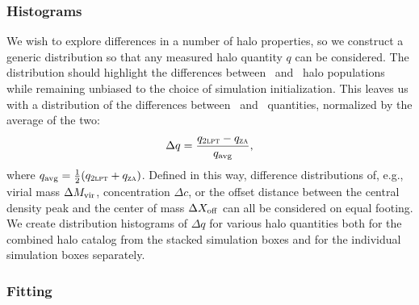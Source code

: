 \subsubsection{Histograms}
\label{subsubsec:analysis--difference_histograms--binning}


We wish to explore differences in a number of halo properties, so we construct a generic distribution so that any measured halo quantity $q$ can be considered.  The distribution should  highlight the differences between \lpt\ and \za\ halo populations while remaining unbiased to the choice of simulation initialization.  This leaves us with a distribution of the differences between \lpt\ and \za\ quantities, normalized by the average of the two:
\begin{equation} \label{eq:analysis--delta_q}
	\Delta q = \frac{q_{\textsc{2lpt}} - q_{\textsc{za}}}{q_{\mathrm{avg}}},
\end{equation}
where $q_{\mathrm{avg}} = \frac{1}{2} (q_{\textsc{2lpt}} + q_{\textsc{za}})$.  Defined in this way, difference distributions of, e.g.,  virial mass $\Delta {M_{\mathrm{vir}}}$, concentration $\Delta c$, or the offset distance between the central density peak and the center of mass $\Delta {X_{\mathrm{off}}}$ can all be considered on equal footing.  We create distribution histograms of $\Delta q$ for various halo quantities both for the combined halo catalog from the stacked simulation boxes and for the individual simulation boxes separately.


\subsubsection{Fitting}
\label{subsubsec:analysis--difference_histograms--fitting}


